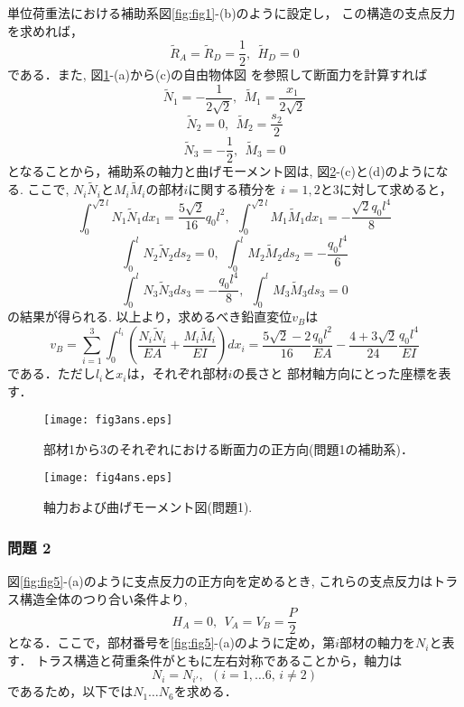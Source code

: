 \documentclass[10pt,a4j]{jarticle}
\begin{document}
	単位荷重法における補助系図\ref{fig:fig1}-(b)のように設定し，
	この構造の支点反力を求めれば，
	\[
		\tilde R_A= \tilde R_D= \frac{1}{2}, \ \ \tilde H_D=0
	\]
	である．また, 図\ref{fig:fig3}-(a)から(c)の自由物体図
	を参照して断面力を計算すれば
	\[
		\tilde N_1=-\frac{1}{2\sqrt{2}}, \ \ \tilde M_1=\frac{x_1}{2\sqrt{2}}
	\]
	\[
		\tilde N_2=0, \ \ \tilde M_2=\frac{s_2}{2}
	\]
	\[
		\tilde N_3=-\frac{1}{2}, \ \ \tilde M_3=0
	\]
	となることから，補助系の軸力と曲げモーメント図は, 図\ref{fig:fig4}-(c)と(d)のようになる.
	ここで, $N_i\tilde N_i$と$M_i\tilde M_i$の部材$i$に関する積分を
	$i=1,2$と3に対して求めると，
	\[
		\int _0^{\sqrt{2}l} N_1 \tilde N_1dx_1=\frac{5\sqrt{2}}{16}q_0l^2
		, \ \ 
		\int _0^{\sqrt{2}l} M_1 \tilde M_1dx_1=-\frac{\sqrt{2}q_0l^4}{8}
	\]
	\[
		\int _0^l N_2 \tilde N_2ds_2=0, \ \ 
		\int _0^l M_2 \tilde M_2ds_2=-\frac{q_0l^4}{6}
	\]
	\[
		\int _0^l N_3 \tilde N_3ds_3=-\frac{q_0l^4}{8}, \ \ 
		\int _0^l M_3 \tilde M_3ds_3=0
	\]
	の結果が得られる.
	以上より，求めるべき鉛直変位$v_B$は
	\[
		v_B=
		\sum_{i=1}^3
		\int_0^{l_i} \left(
			\frac{N_i\tilde N_i}{EA}
			+
			\frac{M_i\tilde M_i}{EI}
		\right) dx_i
		=
		\frac{5\sqrt{2}-2}{16}\frac{q_0l^2}{EA}
		-
		\frac{4+3\sqrt{2}}{24}
		\frac{q_0l^4}{EI}
	\]
	である．ただし$l_i$と$x_i$は，それぞれ部材$i$の長さと
	部材軸方向にとった座標を表す．
\begin{figure}[h]
	\begin{center}
	\texttt{[image: fig3ans.eps]} 
	\end{center}
	\caption{部材1から3のそれぞれにおける断面力の正方向(問題1の補助系)．}
	\label{fig:fig3}
\end{figure}
\begin{figure}[h]
	\begin{center}
	\texttt{[image: fig4ans.eps]} 
	\end{center}
	\caption{軸力および曲げモーメント図(問題1).}
	\label{fig:fig4}
\end{figure}
\clearpage
\subsubsection*{問題 2}
図\ref{fig:fig5}-(a)のように支点反力の正方向を定めるとき, 
これらの支点反力はトラス構造全体のつり合い条件より, 
\[
	H_A=0, \ \ V_A=V_B=\frac{P}{2}
\]
となる．ここで，部材番号を\ref{fig:fig5}-(a)のように定め，第$i$部材の軸力を$N_i$と表す．
トラス構造と荷重条件がともに左右対称であることから，軸力は
\[
	N_i=N_{i'}, \ \ (i=1,\dots 6, \, i\neq 2)
\]
であるため，以下では$N_1 \dots N_6$を求める．
\end{document}

